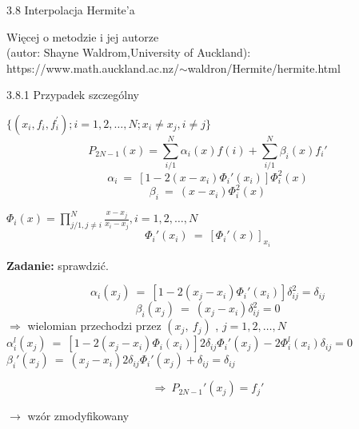\begin{frame}
{3.8 Interpolacja Hermite'a}

Więcej o metodzie i jej autorze \\
(autor: Shayne Waldrom,University of Auckland):\\
\vspace{5mm}
https://www.math.auckland.ac.nz/$\sim$waldron/Hermite/hermite.html
\end{frame}

\begin{frame}
{3.8.1 Przypadek szczególny}

$\{(x_{i}, f_{i}, f_{i}^{'}); i=1,2, \dots, N; x_{i}\neq x_{j}, i\neq j\}$
$$
P_{2N-1}(x)=\sum_{i/1}^{N}\alpha_{i}(x)f(i)+\sum_{i/1}^{N}\beta_{i}(x)f_{i}'
$$
$$
\alpha_{i}\ =\ [1-2(x-x_{i})\Phi_{i}'(x_{i})]\Phi_{i}^{2}(x)
$$
$$
\beta_{i}\ =\ (x-x_{i})\Phi_{i}^{2}(x)
$$
\begin{center}
$\Phi_{i}(x) = \displaystyle \prod_{j/1,j\neq i}^{N}\frac{x-x_{j}}{x_{i}-x_{j}}, i=1, 2,\dots, N$
$$
\Phi_{i}'(x_{i})\ =\ [\Phi_{i}'(x)]_{x_{i}}
$$
\end{center}
\textbf{Zadanie:} sprawdzić.


\end{frame}

\begin{frame}
$$
\alpha_{i}(x_{j})\ =\ [1-2(x_{j}-x_{i})\Phi_{i}'(x_{i})]\delta_{ij}^{2}=\delta_{ij}
$$
$$
\beta_{i}(x_{j})\ =\ (x_{j}-x_{i})\delta_{ij}^{2}=0
$$
$\Rightarrow$ wielomian przechodzi przez $(x_{j},\ f_{j})$ , $j=1,2, \dots, N$ \\
\vspace{3mm}
$\alpha_{i}^{l}(x_{j})\ =\ [1-2(x_{j}-x_{i})\Phi_{i}(x_{i})]2\delta_{ij}\Phi_{i}'(x_{j})-2\Phi_{i}^{l}(x_{i})\delta_{ij}=0$ \\
\vspace{3mm}
$\beta_{i}'(x_{j})\ =\ (x_{j}-x_{i})2\delta_{ij}\Phi_{i}'(x_{j})+\delta_{ij}=\delta_{ij}$

$$
\Rightarrow\ P_{2N-1}'(x_{j})=f_{j}'
$$
\begin{flushright}$\rightarrow$ wzór zmodyfikowany \end{flushright}
\end{frame}


